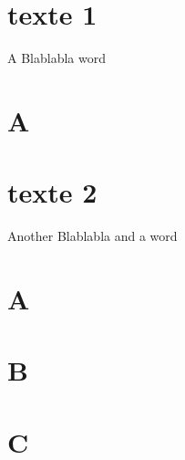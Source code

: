 \documentclass{scrbook}
\begin{document}
\section{texte 1}
\beginnumbering
\pstart
A  Blablabla  word
\pend
\endnumbering

\section{A}


\section{texte 2}
\beginnumbering
\pstart
Another  Blablabla and a  word
\pend
\endnumbering

\section{A}
\section{B}

\section{C}
\end{document}
